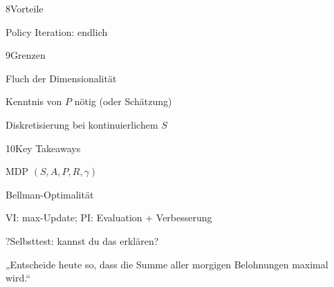 \begin{hngrid}
\begin{hnp}[raster multicolumn=2,acc=hngreen]{8}{Vorteile}
\begin{hnpro}
\item Policy Iteration: endlich
\end{hnpro}
\end{hnp}
%
\begin{hnp}[raster multicolumn=2,acc=hnred]{9}{Grenzen}
\begin{hncon}
\item Fluch der Dimensionalität
\item Kenntnis von $P$ nötig (oder Schätzung)
\item Diskretisierung bei kontinuierlichem $S$
\end{hncon}
\end{hnp}
%
\begin{hnp}[raster multicolumn=2,acc=hnorange]{10}{Key Takeaways}
\begin{hnchk}
\item MDP $(S,A,P,R,\gamma)$
\item Bellman-Optimalität
\item VI: max-Update; PI: Evaluation + Verbesserung
\end{hnchk}
\end{hnp}
%
\begin{hnp}[raster multicolumn=6,acc=hnpurple,colback=hnlilac!30]{?}{Selbsttest: kannst du das erklären?}
\end{hnp}
%
\begin{hnbanner}[raster multicolumn=6]
„Entscheide heute so, dass die Summe aller morgigen Belohnungen maximal wird.“
\end{hnbanner}
\end{hngrid}
